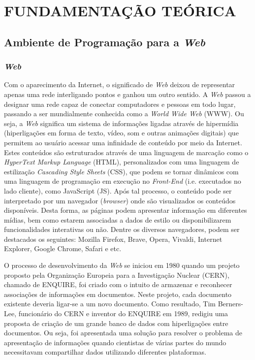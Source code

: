 \chapter{FUNDAMENTAÇÃO TEÓRICA}
\label{FundamentacaoTeorica}

\section{Ambiente de Programação para a \textit{Web}}
\label{AmbienteWeb}

\subsection{\textit{Web}}
\label{SubWeb}

Com o aparecimento da Internet, o significado de \textit{Web} deixou de representar apenas uma rede interligando pontos e ganhou um outro sentido. A \textit{Web} passou a designar uma rede capaz de conectar computadores e pessoas em todo lugar, passando a ser mundialmente conhecida como a \textit{World Wide Web} (WWW). Ou seja, a \textit{Web} significa um sistema de informações ligadas através de hipermídia (hiperligações em forma de texto, vídeo, som e outras animações digitais) que permitem ao usuário acessar uma infinidade de conteúdo por meio da Internet. Estes conteúdos são estruturados através de uma linguagem de marcação como o \textit{HyperText Markup Language} (HTML), personalizados com uma linguagem de estilização \textit{Cascading Style Sheets} (CSS), que podem se tornar dinâmicos com uma linguagem de programação em execução no \textit{Front-End} (i.e. executados no lado cliente), como JavaScript (JS). Após tal processo, o conteúdo pode ser interpretado por um navegador (\textit{browser}) onde são visualizados os conteúdos disponíveis. Desta forma, as páginas podem apresentar informação em diferentes mídias, bem como estarem associadas a dados de estilo ou disponibilizarem funcionalidades interativas ou não. Dentre os diversos navegadores, podem ser destacados os seguintes: Mozilla Firefox, Brave, Opera, Vivaldi, Internet Explorer, Google Chrome, Safari e etc.

O processo de desenvolvimento da \textit{Web} se iniciou em 1980 quando um projeto proposto pela Organização Europeia para a Investigação Nuclear (CERN), chamado de ENQUIRE, foi criado com o intuito de armazenar e reconhecer associações de informações em documentos. Neste projeto, cada documento existente deveria ligar-se a um novo documento. Como resultado, Tim Berners-Lee, funcionário do CERN e inventor do ENQUIRE em 1989, redigiu uma proposta de criação de um grande banco de dados com hiperligações entre documentos. Ou seja, foi apresentada uma solução para resolver o problema de apresentação de informações quando cientistas de várias partes do mundo necessitavam compartilhar dados utilizando diferentes plataformas.

